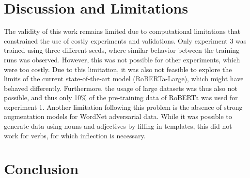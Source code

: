 \documentclass{article}
\begin{document}
\section{Discussion and Limitations}

The validity of this work remains limited due to computational limitations that constrained the use of costly experiments and validations. Only experiment 3 was trained using three different seeds, where similar behavior between the training runs was observed. However, this was not possible for other experiments, which were too costly. Due to this limitation, it was also not feasible to explore the limits of the current state-of-the-art model (RoBERTa-Large), which might have behaved differently. Furthermore, the usage of large datasets was thus also not possible, and thus only 10\% of the pre-training data of RoBERTa was used for experiment 1.
Another limitation following this problem is the absence of strong augmentation models for WordNet adversarial data. While it was possible to generate data using nouns and adjectives by filling in templates, this did not work for verbs, for which inflection is necessary.

\section{Conclusion}
\end{document}
